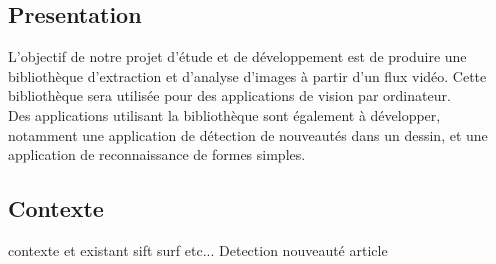 \subsection{Presentation}

L'objectif de notre projet d'étude et de développement est de produire une bibliothèque d'extraction et d'analyse d'images à partir d'un flux vidéo. Cette bibliothèque sera utilisée pour des applications de vision par ordinateur.\\

Des applications utilisant la bibliothèque sont également à développer, notamment une application de détection de nouveautés dans un dessin, et une application de reconnaissance de formes simples.


\subsection{Contexte}
contexte et existant sift surf etc...
Detection nouveauté article
